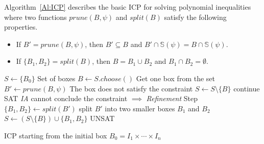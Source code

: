 \documentclass[runningheads,a4paper,oribibl]{llncs}
\begin{document}




Algorithm~\ref{Al:ICP} describes the basic ICP for solving polynomial inequalities
where two functions $prune(B,\psi)$ and $split(B)$ satisfy the following properties.
\begin{itemize}
\item If $B' = prune (B, \psi)$,
  then $B' \subseteq B $ and $ B' \cap \mathbb{S}(\psi) = B \cap \mathbb{S}(\psi)$. 
\item If $\{B_1, B_2\} = split (B)$,
  then $B = B_1 \cup B_2$ and $B_1 \cap B_2 = \emptyset$. 
\end{itemize}
\begin{algorithm}
\begin{algorithmic}[1]
\State $S \gets \{B_0\}$ \Comment Set of boxes
  \State $B \gets S.choose()$ \Comment Get one box from the set
  \State $B' \gets prune(B, \psi)$
   \Comment The box does not satisfy the constraint
  	\State $S \gets S \setminus \{B\}$
  	\State continue
  	\State \Return SAT
  \Else \Comment \emph{IA} cannot conclude the constraint $\implies$ \emph{Refinement} Step
  	\State $\{B_1, B_2\} \gets split(B')$ \Comment split $B'$ into two smaller boxes $B_1$ and $B_2$	
  	\State $S \gets (S \setminus \{B\}) \cup \{B_1, B_2\}$
  \EndIf
\EndWhile
\State \Return UNSAT
\end{algorithmic}
\caption{ICP starting from the initial box $B_0 = I_1 \times \cdots \times I_n$}
\label{Al:ICP}
\end{algorithm}
\end{document}
